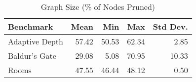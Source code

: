 \begin{table}[ht]
\caption{Graph Size (\% of Nodes Pruned)}
  \label{table-graphsize}
\begin{center}
\begin{tabular}{lrrrr}
\hline
Benchmark &  Mean  & Min  & Max & Std Dev.  \\ 
\hline
Adaptive Depth & 57.42 & 50.53 & 62.34 & 2.85 \\ 
Baldur's Gate & 29.08 & 5.08 & 70.95 & 10.33 \\ 
Rooms & 47.55 & 46.44 & 48.12 & 0.50 \\ 
   \hline
\end{tabular}
\end{center}
\end{table}

